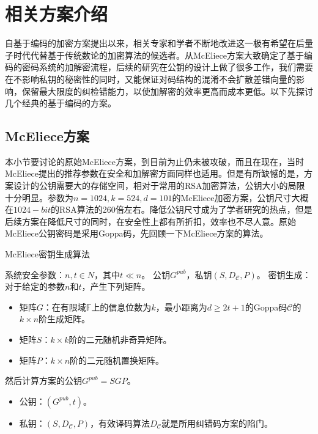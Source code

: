 \chapter{相关方案介绍}
\vspace{-0.2cm}
自基于编码的加密方案提出以来，相关专家和学者不断地改进这一极有希望在后量子时代代替基于传统数论的加密算法的候选者。从McEliece方案大致确定了基于编码的密码系统的加解密流程，后续的研究在公钥的设计上做了很多工作，我们需要在不影响私钥的秘密性的同时，又能保证对码结构的混淆不会扩散差错向量的影响，保留最大限度的纠检错能力，以使加解密的效率更高而成本更低。以下先探讨几个经典的基于编码的方案。
\section{McEliece方案}
本小节要讨论的原始McEliece方案，到目前为止仍未被攻破，而且在现在，当时McEliece提出的推荐参数在安全和加解密方面同样也适用。但是有所缺憾的是，方案设计的公钥需要大的存储空间，相对于常用的RSA加密算法，公钥大小的局限十分明显。参数为$n=1024,k=524,d=101$的McEliece加密方案，公钥尺寸大概在$1024-bit$的RSA算法的260倍左右。降低公钥尺寸成为了学者研究的热点，但是后续方案在降低尺寸的同时，在安全性上都有所折扣，效率也不尽人意。原始McEliece公钥密码是采用Goppa码，先回顾一下McEliece方案的算法。

\begin{breakablealgorithm}
	\small
	\renewcommand{\algorithmicrequire}{\textbf{Input:}}
	\renewcommand{\algorithmicensure}{\textbf{Output:}}
	\caption{McEliece密钥生成算法}
	\label{alg:McElieceKeyGen}
	\begin{algorithmic}[1]
		\Require
		系统安全参数：$n,t \in N$，其中$t \ll n$。
		\Ensure
		公钥$G^{pub}$，私钥$(S,D_\mathcal{C},P)$。
		\State
		密钥生成：对于给定的参数$n$和$t$，产生下列矩阵。
		\begin{itemize}
			\item 矩阵$G$：在有限域$\mathbb{F}$上的信息位数为$k$，最小距离为$d \geq 2t + 1$的Goppa码$\mathcal{C}$的$k \times n$阶生成矩阵。
			\item 矩阵$S$：$k \times k$阶的二元随机非奇异矩阵。
			\item 矩阵$P$：$k \times n$阶的二元随机置换矩阵。
		\end{itemize}
		\State
		然后计算方案的公钥$G^{pub} = SGP$。
		\begin{itemize}
			\item 公钥：$(G^{pub},t)$。
			\item 私钥：$(S,D_\mathcal{C},P)$，有效译码算法$D_\mathcal{C}$就是所用纠错码方案的陷门。
		\end{itemize}
	\end{algorithmic}
\end{breakablealgorithm}

